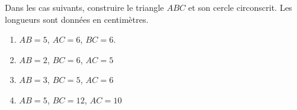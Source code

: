 
\begin{exercice}\label{exosmath-0960}

    Dans les cas suivants, construire le triangle \( ABC\) et son cercle circonscrit. Les longueurs sont données en centimètres.
    \begin{enumerate}
        \item
            \( AB=5\), \( AC=6\), \( BC=6\).
        \item
            \( AB=2\), \( BC=6\), \( AC=5\)
        \item
            \( AB=3\), \( BC=5\), \( AC=6\)
        \item
            \( AB=5\), \( BC=12\), \( AC=10\)
    \end{enumerate}

\end{exercice}
